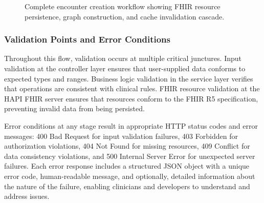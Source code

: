 \begin{figure}[H]
{\begin{minipage}{\dimexpr\textwidth-2\fboxsep-2\fboxrule\relax}
        \end{minipage}}
    \caption{Complete encounter creation workflow showing FHIR resource persistence, graph construction, and cache invalidation cascade.}
    \label{fig:encounter_creation_flow}
\end{figure}

\subsubsection{Validation Points and Error Conditions}
Throughout this flow, validation occurs at multiple critical junctures. Input
validation at the controller layer ensures that user-supplied data conforms to
expected types and ranges. Business logic validation in the service layer
verifies that operations are consistent with clinical rules. FHIR resource
validation at the HAPI FHIR server ensures that resources conform to the FHIR
R5 specification, preventing invalid data from being persisted.

Error conditions at any stage result in appropriate HTTP status codes and error
messages: 400 Bad Request for input validation failures, 403 Forbidden for
authorization violations, 404 Not Found for missing resources, 409 Conflict for
data consistency violations, and 500 Internal Server Error for unexpected
server failures. Each error response includes a structured JSON object with a
unique error code, human-readable message, and optionally, detailed information
about the nature of the failure, enabling clinicians and developers to
understand and address issues.

